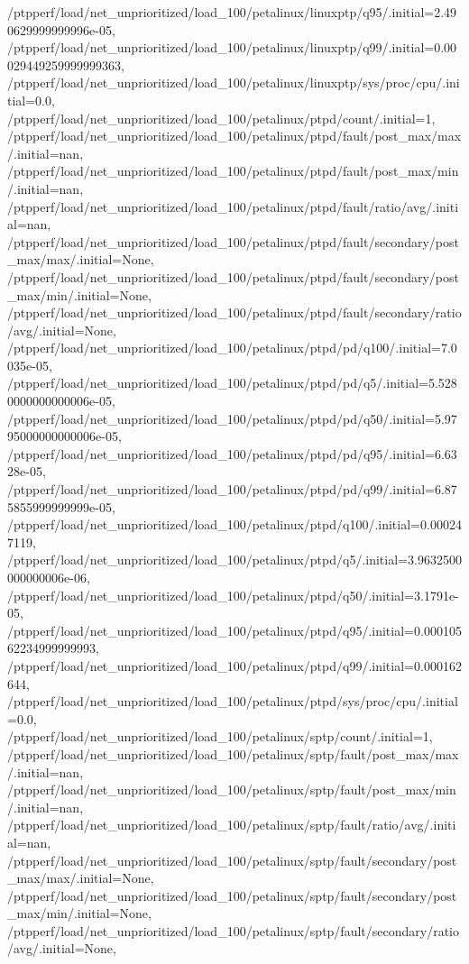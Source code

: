 {    /ptpperf/load/net_unprioritized/load_100/petalinux/linuxptp/q95/.initial=2.490629999999996e-05,
    /ptpperf/load/net_unprioritized/load_100/petalinux/linuxptp/q99/.initial=0.00029449259999999363,
    /ptpperf/load/net_unprioritized/load_100/petalinux/linuxptp/sys/proc/cpu/.initial=0.0,
    /ptpperf/load/net_unprioritized/load_100/petalinux/ptpd/count/.initial=1,
    /ptpperf/load/net_unprioritized/load_100/petalinux/ptpd/fault/post_max/max/.initial=nan,
    /ptpperf/load/net_unprioritized/load_100/petalinux/ptpd/fault/post_max/min/.initial=nan,
    /ptpperf/load/net_unprioritized/load_100/petalinux/ptpd/fault/ratio/avg/.initial=nan,
    /ptpperf/load/net_unprioritized/load_100/petalinux/ptpd/fault/secondary/post_max/max/.initial=None,
    /ptpperf/load/net_unprioritized/load_100/petalinux/ptpd/fault/secondary/post_max/min/.initial=None,
    /ptpperf/load/net_unprioritized/load_100/petalinux/ptpd/fault/secondary/ratio/avg/.initial=None,
    /ptpperf/load/net_unprioritized/load_100/petalinux/ptpd/pd/q100/.initial=7.0035e-05,
    /ptpperf/load/net_unprioritized/load_100/petalinux/ptpd/pd/q5/.initial=5.5280000000000006e-05,
    /ptpperf/load/net_unprioritized/load_100/petalinux/ptpd/pd/q50/.initial=5.9795000000000006e-05,
    /ptpperf/load/net_unprioritized/load_100/petalinux/ptpd/pd/q95/.initial=6.6328e-05,
    /ptpperf/load/net_unprioritized/load_100/petalinux/ptpd/pd/q99/.initial=6.875855999999999e-05,
    /ptpperf/load/net_unprioritized/load_100/petalinux/ptpd/q100/.initial=0.000247119,
    /ptpperf/load/net_unprioritized/load_100/petalinux/ptpd/q5/.initial=3.9632500000000006e-06,
    /ptpperf/load/net_unprioritized/load_100/petalinux/ptpd/q50/.initial=3.1791e-05,
    /ptpperf/load/net_unprioritized/load_100/petalinux/ptpd/q95/.initial=0.00010562234999999993,
    /ptpperf/load/net_unprioritized/load_100/petalinux/ptpd/q99/.initial=0.000162644,
    /ptpperf/load/net_unprioritized/load_100/petalinux/ptpd/sys/proc/cpu/.initial=0.0,
    /ptpperf/load/net_unprioritized/load_100/petalinux/sptp/count/.initial=1,
    /ptpperf/load/net_unprioritized/load_100/petalinux/sptp/fault/post_max/max/.initial=nan,
    /ptpperf/load/net_unprioritized/load_100/petalinux/sptp/fault/post_max/min/.initial=nan,
    /ptpperf/load/net_unprioritized/load_100/petalinux/sptp/fault/ratio/avg/.initial=nan,
    /ptpperf/load/net_unprioritized/load_100/petalinux/sptp/fault/secondary/post_max/max/.initial=None,
    /ptpperf/load/net_unprioritized/load_100/petalinux/sptp/fault/secondary/post_max/min/.initial=None,
    /ptpperf/load/net_unprioritized/load_100/petalinux/sptp/fault/secondary/ratio/avg/.initial=None,
}
